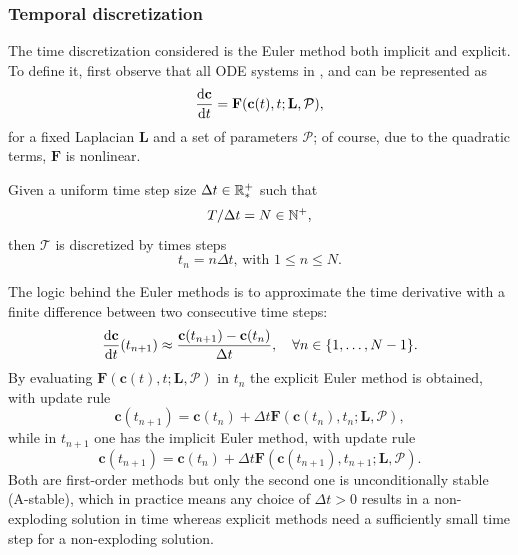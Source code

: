 \documentclass{article}
\begin{document}
            \subsubsection{Temporal discretization}\label{secTemporalDiscretization}

                The time discretization considered is the Euler method both implicit and explicit. To define it, first observe that all ODE systems in \FKdiscrete{}, \HDdiscrete{} and \SMOdiscrete{} can be represented as
                \begin{equation}
                    \frac{\mathrm{d}\mathbf c}{\mathrm{d}t}=\mathbf F(\mathbf c(t),t;\mathbf L,\mathcal P),
                    \label{eqGenericSystemODE}
                \end{equation}
                for a fixed Laplacian $\mathbf L$ and a set of parameters $\mathcal P$; of course, due to the quadratic terms, $\mathbf F$ is nonlinear.

                Given a uniform time step size $\Delta t\in\mathbb R_*^+$ such that \[T/\Delta t=N\in\mathbb N^+,\]then $\mathcal T$ is discretized by times steps \[t_n=n\Delta t\text{, with }1\le n\le N.\]

                The logic behind the Euler methods is to approximate the time derivative with a finite difference between two consecutive time steps:
                \begin{equation*}
                    \frac{\mathrm{d}\mathbf c}{\mathrm{d}t}(t_{n+1})\approx
                    \frac{\mathbf c(t_{n+1})-\mathbf c(t_n)}{\Delta t},
                    \quad\forall n\in\{1,\ldots,N-1\}.
                \end{equation*}
                By evaluating $\mathbf F(\mathbf c(t),t;\mathbf L,\mathcal P)$ in $t_n$ the explicit Euler method is obtained, with update rule
                \begin{equation}
                    \mathbf c(t_{n+1})=\mathbf c(t_n)
                    +\Delta t\mathbf F(\mathbf c(t_n),t_n;\mathbf L,\mathcal P),
                    \label{eqUpdateRuleEE}
                \end{equation}
                while in $t_{n+1}$ one has the implicit Euler method, with update rule
                \begin{equation}
                    \mathbf c(t_{n+1})=\mathbf c(t_n)
                    +\Delta t\mathbf F(\mathbf c(t_{n+1}),t_{n+1};\mathbf L,\mathcal P).
                    \label{eqUpdateRuleEI}
                \end{equation}
                Both are first-order methods but only the second one is unconditionally stable (A-stable), which in practice means any choice of $\Delta t>0$ results in a non-exploding solution in time whereas explicit methods need a sufficiently small time step for a non-exploding solution.
\end{document}
